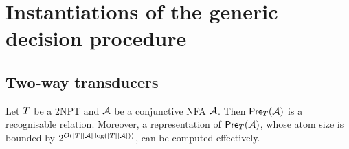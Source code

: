 
\section{Instantiations of the generic decision procedure}
 
\subsection{Two-way transducers}\label{sec-2way}



\begin{lemma}\label{lem-2pt}
Let $T$ be a 2NPT and $\mathcal{A}$ be a conjunctive NFA $\mathcal{A}$. Then $\textsf{Pre}_{T}(\mathcal{A})$ is a recognisable relation. Moreover, a representation of $\textsf{Pre}_{T}(\mathcal{A})$, whose atom size is bounded by $2^{O(|T||\mathcal{A}|\log (|T||\mathcal{A}|))}$, can be computed effectively.
\end{lemma}


